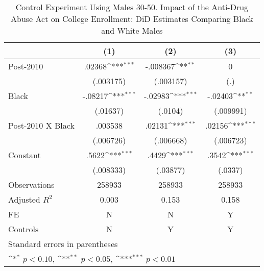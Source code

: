 \begin{table}[htbp]\centering
\def\sym#1{\ifmmode^{#1}\else\(^{#1}\)\fi}
\caption{Control Experiment Using Males 30-50. Impact of the Anti-Drug Abuse Act on College Enrollment: DiD Estimates Comparing Black and White Males}
\begin{tabular}{l*{3}{c}}
\hline\hline
                    &\multicolumn{1}{c}{(1)}         &\multicolumn{1}{c}{(2)}         &\multicolumn{1}{c}{(3)}         \\
\hline
Post-2010           &      .02368\sym{***}&    -.008367\sym{**} &           0         \\
                    &   (.003175)         &   (.003157)         &         (.)         \\
[1em]
Black               &     -.08217\sym{***}&     -.02983\sym{***}&     -.02403\sym{**} \\
                    &    (.01637)         &     (.0104)         &   (.009991)         \\
[1em]
Post-2010 X Black   &     .003538         &      .02131\sym{***}&      .02156\sym{***}\\
                    &   (.006726)         &   (.006668)         &   (.006723)         \\
[1em]
Constant            &       .5622\sym{***}&       .4429\sym{***}&       .3542\sym{***}\\
                    &   (.008333)         &    (.03877)         &     (.0337)         \\
\hline
Observations        &      258933         &      258933         &      258933         \\
Adjusted \(R^{2}\)  &       0.003         &       0.153         &       0.158         \\
FE                  &           N         &           N         &           Y         \\
Controls            &           N         &           Y         &           Y         \\
\hline\hline
\multicolumn{4}{l}{\footnotesize Standard errors in parentheses}\\
\multicolumn{4}{l}{\footnotesize \sym{*} \(p<0.10\), \sym{**} \(p<0.05\), \sym{***} \(p<0.01\)}\\
\end{tabular}
\end{table}
